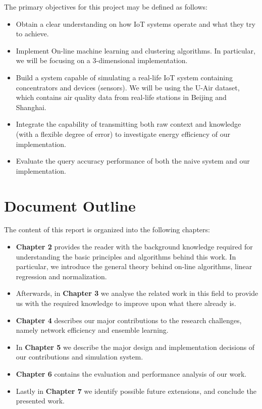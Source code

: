 \documentclass{mproj}
\begin{document}
The primary objectives for this project may be defined as follows:
\begin{itemize}  
\item Obtain a clear understanding on how IoT systems operate and what they try to achieve.
\item Implement On-line machine learning and clustering algorithms. In particular, we will be focusing on a 3-dimensional implementation.
\item Build a system capable of simulating a real-life IoT system containing concentrators and devices (sensors). We will be using the U-Air \cite{air-quality-inference-meets-big-data} dataset, which contains air quality data from real-life stations in Beijing and Shanghai.
\item Integrate the capability of transmitting both raw context and knowledge (with a flexible degree of error) to investigate energy efficiency of our implementation.
\item Evaluate the query accuracy performance of both the naive system and our implementation.
\end{itemize}

\section{Document Outline}
The content of this report is organized into the following chapters:
\begin{itemize}
\item \textbf{Chapter 2} provides the reader with the background knowledge required for understanding the basic principles and algorithms behind this work. In particular, we introduce the general theory behind on-line algorithms, linear regression and normalization.
\item Afterwards, in \textbf{Chapter 3} we analyse the related work in this field to provide us with the required knowledge to improve upon what there already is.
\item \textbf{Chapter 4} describes our major contributions to the research challenges, namely network efficiency and ensemble learning.
\item In \textbf{Chapter 5} we describe the major design and implementation decisions of our contributions and simulation system.
\item \textbf{Chapter 6} contains the evaluation and performance analysis of our work.
\item Lastly in \textbf{Chapter 7} we identify possible future extensions, and conclude the presented work.
\end{itemize}
\end{document}
